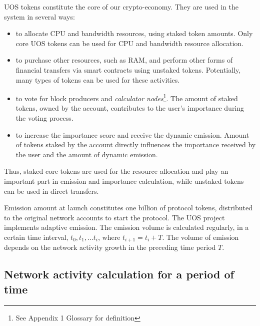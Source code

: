 \documentclass[a4paper,12pt]{article}
\begin{document}
U{\degree}OS tokens constitute the core of our crypto-economy. They are used in the system in several ways:

\begin{itemize}
\item to allocate CPU and bandwidth resources, using staked token amounts. Only core U{\degree}OS tokens can be used for CPU and bandwidth resource allocation.
\item to purchase other resources, such as RAM, and perform other forms of financial transfers via smart contracts using unstaked tokens. Potentially, many types of tokens can be used for these activities.
\item to vote for block producers and \emph{calculator nodes}\footnote{See Appendix 1 Glossary for definition}. The amount of staked tokens, owned by the account, contributes to the user's importance during the voting process.
\item to increase the importance score and receive the dynamic emission. Amount of tokens staked by the account directly influences the importance received by the user and the amount of dynamic emission.
\end{itemize}

Thus, staked core tokens are used for the resource allocation and play an important part in emission and importance calculation, while unstaked tokens can be used in direct transfers. 

Emission amount at launch constitutes one billion of protocol tokens, distributed to the original network accounts to start the protocol. The U{\degree}OS project implements adaptive emission. The emission volume is calculated regularly, in a certain time interval, $t_0, t_1, ... t_i$, where $t_{i+1} = t_i + T$. The volume of emission depends on the network activity growth in the preceding time period $T$.


\subsection{Network activity calculation for a period of time}
\end{document}
